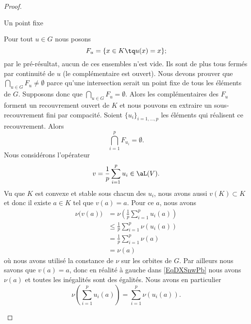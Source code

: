 \begin{proof}
\begin{subproof}
    \item[Un point fixe]

        Pour tout \( u\in G\) nous posons
        \begin{equation}
            F_u=\{ x\in K\tq u(x)=x \};
        \end{equation}
        par le pré-résultat, aucun de ces ensembles n'est vide. Ils sont de plus tous fermés par continuité de \( u\) (le complémentaire est ouvert). Nous devons prouver que \( \bigcap_{u\in G}F_u\neq \emptyset\) parce qu'une intersection serait un point fixe de tous les éléments de \( G\). Supposons donc que \( \bigcap_{u\in G}F_u=\emptyset\). Alors les complémentaires des \( F_u\) forment un recouvrement ouvert de \( K\) et nous pouvons en extraire un sous-recouvrement fini par compacité. Soient \( \{ u_i \}_{i=1,\ldots, p}\) les éléments qui réalisent ce recouvrement. Alors
        \begin{equation}
            \bigcap_{i=1}^pF_{u_i}=\emptyset.
        \end{equation}
        Nous considérons l'opérateur
        \begin{equation}
            v=\frac{1}{ p }\sum_{i=1}^pu_i\in\aL(V).
        \end{equation}
        Vu que \( K\) est convexe et stable sous chacun des \( u_i\), nous avons aussi \( v(K)\subset K\) et donc il existe \( a\in K\) tel que \( v(a)=a\). Pour ce \( a\), nous avons
        \begin{subequations}
            \begin{align}
                \nu\big( v(a) \big)&=\nu\left( \frac{1}{ p }\sum_{i=1}^pu_i(a) \right)      \label{EqDXSnwPb}\\
                &\leq \frac{1}{ p }\sum_{i=1}^p\nu\left( u_i(a) \right)\\
                &=\frac{1}{ p }\sum_{i=1}^p\nu(a)\\
                &=\nu(a)
            \end{align}
        \end{subequations}
        où nous avons utilisé la constance de \( \nu\) sur les orbites de \( G\). Par ailleurs nous savons que \( v(a)=a\), donc en réalité à gauche dans \eqref{EqDXSnwPb} nous avons \( \nu(a)\) et toutes les inégalités sont des égalités. Nous avons en particulier
        \begin{equation}        \label{EqBMjypoV}
                \nu\left( \sum_{i=1}^pu_i(a) \right) =\sum_{i=1}^p\nu\left( u_i(a) \right).
        \end{equation}

\end{subproof}
\end{proof}
